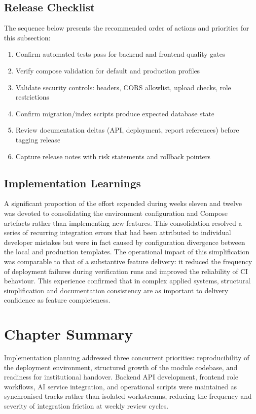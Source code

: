 \subsection{Release Checklist}

The sequence below presents the recommended order of actions and priorities for this subsection:

\begin{enumerate}
\item Confirm automated tests pass for backend and frontend quality gates
\item Verify compose validation for default and production profiles
\item Validate security controls: headers, CORS allowlist, upload checks, role restrictions
\item Confirm migration/index scripts produce expected database state
\item Review documentation deltas (API, deployment, report references) before tagging release
\item Capture release notes with risk statements and rollback pointers
\end{enumerate}

\subsection{Implementation Learnings}

A significant proportion of the effort expended during weeks eleven and twelve was devoted to consolidating the environment configuration and Compose artefacts rather than implementing new features. This consolidation resolved a series of recurring integration errors that had been attributed to individual developer mistakes but were in fact caused by configuration divergence between the local and production templates. The operational impact of this simplification was comparable to that of a substantive feature delivery: it reduced the frequency of deployment failures during verification runs and improved the reliability of CI behaviour. This experience confirmed that in complex applied systems, structural simplification and documentation consistency are as important to delivery confidence as feature completeness.

\section{Chapter Summary}

Implementation planning addressed three concurrent priorities: reproducibility of the deployment environment, structured growth of the module codebase, and readiness for institutional handover. Backend API development, frontend role workflows, AI service integration, and operational scripts were maintained as synchronised tracks rather than isolated workstreams, reducing the frequency and severity of integration friction at weekly review cycles.

